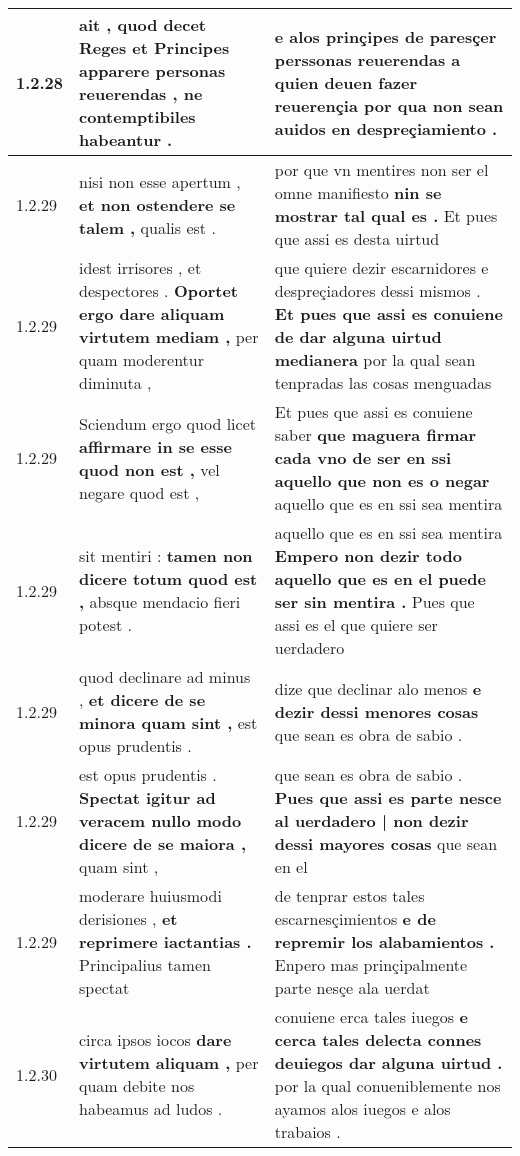 \begin{tabular}{|p{1cm}|p{6.5cm}|p{6.5cm}|}
1.2.28 & ait , quod decet Reges et Principes \textbf{ apparere personas reuerendas , } ne contemptibiles habeantur . & e alos prinçipes de paresçer \textbf{ perssonas reuerendas a quien deuen fazer reuerençia } por qua non sean auidos en despreçiamiento . \\\hline
1.2.29 & nisi non esse apertum , \textbf{ et non ostendere se talem , } qualis est . & por que vn mentires non ser el omne manifiesto \textbf{ nin se mostrar tal qual es . } Et pues que assi es desta uirtud \\\hline
1.2.29 & idest irrisores , et despectores . \textbf{ Oportet ergo dare aliquam virtutem mediam , } per quam moderentur diminuta , & que quiere dezir escarnidores e despreçiadores dessi mismos . \textbf{ Et pues que assi es conuiene de dar alguna uirtud medianera } por la qual sean tenpradas las cosas menguadas \\\hline
1.2.29 & Sciendum ergo quod licet \textbf{ affirmare in se esse quod non est , } vel negare quod est , & Et pues que assi es conuiene saber \textbf{ que maguera firmar cada vno de ser en ssi aquello que non es o negar } aquello que es en ssi sea mentira \\\hline
1.2.29 & sit mentiri : \textbf{ tamen non dicere totum quod est , } absque mendacio fieri potest . & aquello que es en ssi sea mentira \textbf{ Empero non dezir todo aquello que es en el puede ser sin mentira . } Pues que assi es el que quiere ser uerdadero \\\hline
1.2.29 & quod declinare ad minus , \textbf{ et dicere de se minora quam sint , } est opus prudentis . & dize que declinar alo menos \textbf{ e dezir dessi menores cosas } que sean es obra de sabio . \\\hline
1.2.29 & est opus prudentis . \textbf{ Spectat igitur ad veracem nullo modo dicere de se maiora , } quam sint , & que sean es obra de sabio . \textbf{ Pues que assi es parte nesce al uerdadero | non dezir dessi mayores cosas } que sean en el \\\hline
1.2.29 & moderare huiusmodi derisiones , \textbf{ et reprimere iactantias . } Principalius tamen spectat & de tenprar estos tales escarnesçimientos \textbf{ e de repremir los alabamientos . } Enpero mas prinçipalmente parte nesçe ala uerdat \\\hline
1.2.30 & circa ipsos iocos \textbf{ dare virtutem aliquam , } per quam debite nos habeamus ad ludos . & conuiene erca tales iuegos \textbf{ e cerca tales delecta connes deuiegos dar alguna uirtud . } por la qual conueniblemente nos ayamos alos iuegos e alos trabaios . \\\hline

\end{tabular}
